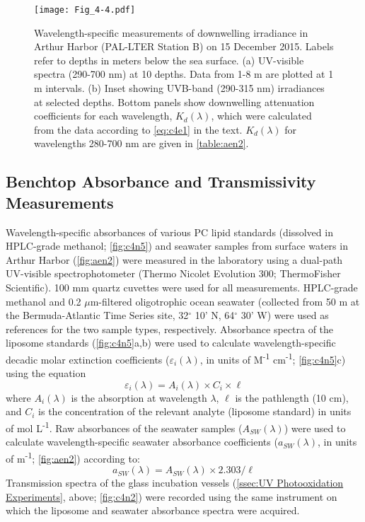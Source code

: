 \begin{figure}[!t]
\centering
\texttt{[image: Fig\_4-4.pdf]}
\caption[Wavelength-specific measurements of downwelling irradiance in Arthur Harbor]{Wavelength-specific measurements of downwelling irradiance in Arthur Harbor (PAL-LTER Station B) on 15 December 2015. Labels refer to depths in meters below the sea surface. (a) UV-visible spectra (290-700 nm) at 10 depths. Data from 1-8 m are plotted at 1 m intervals. (b) Inset showing UVB-band (290-315 nm) irradiances at selected depths. Bottom panels show downwelling attenuation coefficients for each wavelength, ${K_d}(\lambda )$, which were calculated from the data according to \autoref{eq:c4e1} in the text. ${K_d}(\lambda )$ for wavelengths 280-700 nm are given in \autoref{table:aen2}.}
\label{fig:c4n4}
\end{figure}

\subsection{Benchtop Absorbance and Transmissivity Measurements}
\label{ssec:Benchtop Absorbance and Transmissivity Measurements}

Wavelength-specific absorbances of various PC lipid standards (dissolved in HPLC-grade methanol; \autoref{fig:c4n5}) and seawater samples from surface waters in Arthur Harbor (\autoref{fig:aen2}) were measured in the laboratory using a dual-path UV-visible spectrophotometer (Thermo Nicolet Evolution 300; ThermoFisher Scientific). 100 mm quartz cuvettes were used for all measurements. HPLC-grade methanol and 0.2 $\mu$m-filtered oligotrophic ocean seawater (collected from 50 m at the Bermuda-Atlantic Time Series site, 32$^{\circ}$ 10' N, 64$^{\circ}$ 30' W) were used as references for the two sample types, respectively. Absorbance spectra of the liposome standards (\autoref{fig:c4n5}a,b) were used to calculate wavelength-specific decadic molar extinction coefficients (${\varepsilon _i}(\lambda )$, in units of M\textsuperscript{-1} cm\textsuperscript{-1}; \autoref{fig:c4n5}c) using the equation
\begin{equation} \label{eq:c4e3}
{\varepsilon _i}(\lambda ) = {A_i}(\lambda ) \times {C_i} \times \ell 
\end{equation}
where ${A_i}(\lambda )$ is the absorption at wavelength $\lambda$, $\ell$ is the pathlength (10 cm), and ${C_i}$ is the concentration of the relevant analyte (liposome standard) in units of mol L\textsuperscript{-1}. Raw absorbances of the seawater samples (${A_{SW}}(\lambda )$) were used to calculate wavelength-specific seawater absorbance coefficients (${a_{SW}}(\lambda )$, in units of m\textsuperscript{-1}; \autoref{fig:aen2}) according to:
\begin{equation} \label{eq:c4e4}
{a_{SW}}(\lambda ) = {A_{SW}}(\lambda ) \times 2.303/\ell 
\end{equation}
Transmission spectra of the glass incubation vessels (\autoref{ssec:UV Photooxidation Experiments}, above; \autoref{fig:c4n2}) were recorded using the same instrument on which the liposome and seawater absorbance spectra were acquired.

